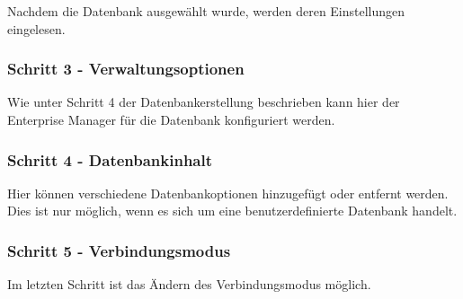             Nachdem die Datenbank ausgewählt wurde, werden deren Einstellungen eingelesen.
          \subsubsection{Schritt 3 - Verwaltungsoptionen}
            Wie unter Schritt 4 der Datenbankerstellung beschrieben kann hier der Enterprise Manager für die Datenbank konfiguriert werden.
          \subsubsection{Schritt 4 - Datenbankinhalt}
            Hier können verschiedene Datenbankoptionen hinzugefügt oder entfernt werden. Dies ist nur möglich, wenn es sich um eine benutzerdefinierte Datenbank handelt.
          \subsubsection{Schritt 5 - Verbindungsmodus}
            Im letzten Schritt ist das Ändern des Verbindungsmodus möglich.
\clearpage
